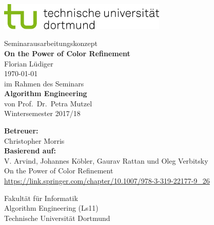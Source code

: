 \documentclass[a4paper,12pt,twoside]{article}
\begin{document}

\begin{titlepage}
\vspace*{-2cm}
\newlength{\links}
\setlength{\links}{-1.5cm} \sf \LARGE

\hspace*{\links}
\begin{minipage}{12.5cm}
\includegraphics[width=8cm]{tud_logo_rgb}
\end{minipage}

\vspace*{4cm}

\large
\begin{center}
{\Large Seminarausarbeitungskonzept} \\[1ex]
{\LARGE\textbf{On the Power of Color Refinement}}\\[3ex]
Florian Lüdiger\\[1ex]
\today\\[7ex]
im Rahmen des Seminars\\[1ex]
{\Large\textbf{Algorithm Engineering}}\\[1ex]
von Prof.~Dr.~Petra Mutzel\\[1ex]
Wintersemester 2017/18
\end{center}

\vspace*{4cm}
\hspace*{\links}
\begin{minipage}[b]{15cm}
\normalsize \raggedright
\textbf{Betreuer:} \\
Christopher Morris \\[2ex]

\textbf{Basierend auf:}\\
V. Arvind, Johannes Köbler, Gaurav Rattan und Oleg Verbitsky\\
On the Power of Color Refinement\\
\url{https://link.springer.com/chapter/10.1007/978-3-319-22177-9_26}
\end{minipage}

\vfill
\hspace*{\links}
\begin{minipage}[b]{8cm}
\normalsize \raggedright
Fakultät für Informatik\\
Algorithm Engineering (Ls11)\\
Technische Universität Dortmund
\end{minipage}

\end{titlepage}
\end{document}
